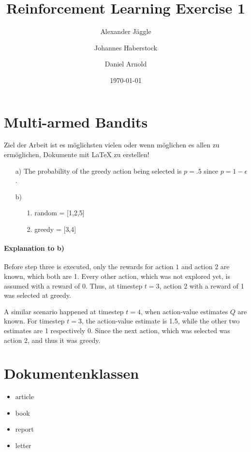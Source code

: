 \documentclass{article}
\title{Reinforcement Learning Exercise 1}
\author{Alexander J\"aggle}
\author{Johannes Haberstock}
\author{Daniel Arnold}
\affil{M.Sc. Autonomous Systems, University of Stuttgart}
\date{\today}
\begin{document}
\maketitle

\section{Multi-armed Bandits}
Ziel der Arbeit ist es m\"oglichsten vielen oder wenn m\"oglichen es allen 
zu erm\"oglichen, Dokumente mit \LaTeX{} zu erstellen!

\begin{itemize}
    \item[a)] The probability of the greedy action being selected is $p = .5$ since $p = 1- \epsilon$.   
    \item[b)] {\begin{itemize}
        \item[1.] random = [{1,2,5}]
        \item[2.] greedy = [{3,4}]
    \end{itemize}}
\end{itemize}


\paragraph{Explanation to b)}
Before step three is executed, only the rewards for action $1$ and action $2$ are known, which both are 1. 
Every other action, which was not explored yet, is assumed with a reward of 0. Thus, at timestep $t = 3$, 
action $2$ with a reward of 1 was selected at greedy. 

A similar scenario happened at timestep $t = 4$, when action-value estimates $Q$ are known. For timestep $t = 3$,
the action-value estimate is 1.5, while the other two estimates are 1 respectively 0. Since the next action, which
was selected was action $2$, and thus it was greedy. 


\section{Dokumentenklassen} \label{documentclasses}

\begin{itemize}
\item article
\item book 
\item report 
\item letter 
\end{itemize}
\end{document}
